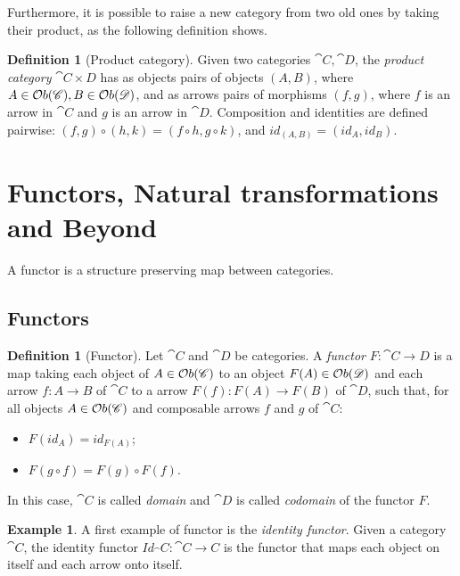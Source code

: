\documentclass[a4paper, twoside,openright]{report}
\theoremstyle{plain}
\theoremstyle{definition}
\newtheorem{definition}[theorem]{Definition}
\newtheorem{example}[theorem]{Example}
\begin{document}
Furthermore, it is possible to raise a new category from two old ones by taking their product, as the following definition shows.

\begin{definition}[Product category]
    Given two categories $\cat C, \cat D$, the \emph{product category} $\cat{C\times D}$ has as objects pairs of objects $(A, B)$, where $A \in \mathcal{O}b(\mathscr{C}), B \in \mathcal{O}b(\mathscr{D})$, and as arrows pairs of morphisms $(f, g)$, where $f$ is an arrow in $\cat C$ and $g$ is an arrow in $\cat D$. Composition and identities are defined pairwise: $(f, g) \circ (h, k) = (f \circ h, g \circ k)$, and $id_{(A, B)} = (id_A, id_B)$.

\end{definition}

\section{Functors, Natural transformations and Beyond}\label{sect:funct_nats}

A functor is a structure preserving map between categories. 

\subsection{Functors}
\begin{definition}[Functor]
    Let $\cat{C}$ and $\cat{D}$ be categories. A \emph{functor} $F:\cat{C \rightarrow D}$ is a map taking each object of $A \in \mathcal{O}b(\mathscr{C})$ to an object $F(A) \in \mathcal{O}b(\mathscr{D})$ and each arrow $f:A\rightarrow B$ of $\cat C$ to a arrow $F(f): F(A) \rightarrow F(B)$ of $\cat D$, such that, for all objects $A \in \mathcal{O}b(\mathscr{C})$ and composable arrows $f$ and $g$ of $\cat C$:
    \begin{itemize}
        \item $F(id_{A}) = id_{F(A)}$;
        \item $F(g \circ f) = F(g) \circ F(f)$.
    \end{itemize}

    In this case, $\cat C$ is called \emph{domain} and $\cat D$ is called \emph{codomain} of the functor $F$.
\end{definition}

\begin{example}
    A first example of functor is the \emph{identity functor}. Given a category $\cat C$, the identity functor $Id_\cat C :\cat{C \rightarrow C}$ is the functor that maps each object on itself and each arrow onto itself. 
\end{example}
\end{document}
